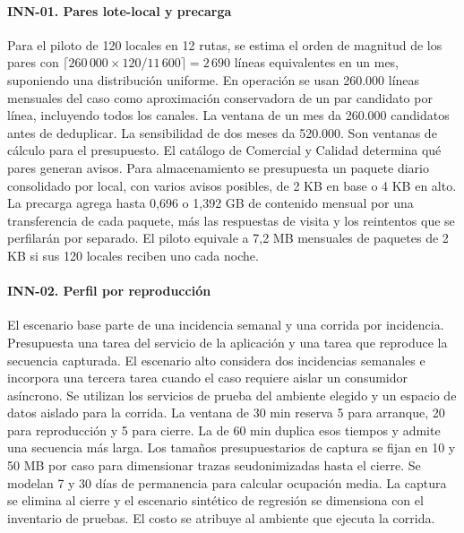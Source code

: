 \paragraph{INN-01. Pares lote-local y precarga}
Para el piloto de 120 locales en 12 rutas, se estima el orden de magnitud de los pares con $\lceil 260\,000\times 120/11\,600\rceil=2\,690$ líneas equivalentes en un mes, suponiendo una distribución uniforme. En operación se usan 260.000 líneas mensuales del caso como aproximación conservadora de un par candidato por línea, incluyendo todos los canales. La ventana de un mes da 260.000 candidatos antes de deduplicar. La sensibilidad de dos meses da 520.000. Son ventanas de cálculo para el presupuesto. El catálogo de Comercial y Calidad determina qué pares generan avisos. Para almacenamiento se presupuesta un paquete diario consolidado por local, con varios avisos posibles, de 2 KB en base o 4 KB en alto. La precarga agrega hasta 0,696 o 1,392 GB de contenido mensual por una transferencia de cada paquete, más las respuestas de visita y los reintentos que se perfilarán por separado. El piloto equivale a 7,2 MB mensuales de paquetes de 2 KB si sus 120 locales reciben uno cada noche.

\paragraph{INN-02. Perfil por reproducción}
El escenario base parte de una incidencia semanal y una corrida por incidencia. Presupuesta una tarea del servicio de la aplicación y una tarea que reproduce la secuencia capturada. El escenario alto considera dos incidencias semanales e incorpora una tercera tarea cuando el caso requiere aislar un consumidor asíncrono. Se utilizan los servicios de prueba del ambiente elegido y un espacio de datos aislado para la corrida. La ventana de 30 min reserva 5 para arranque, 20 para reproducción y 5 para cierre. La de 60 min duplica esos tiempos y admite una secuencia más larga. Los tamaños presupuestarios de captura se fijan en 10 y 50 MB por caso para dimensionar trazas seudonimizadas hasta el cierre. Se modelan 7 y 30 días de permanencia para calcular ocupación media. La captura se elimina al cierre y el escenario sintético de regresión se dimensiona con el inventario de pruebas. El costo se atribuye al ambiente que ejecuta la corrida.

